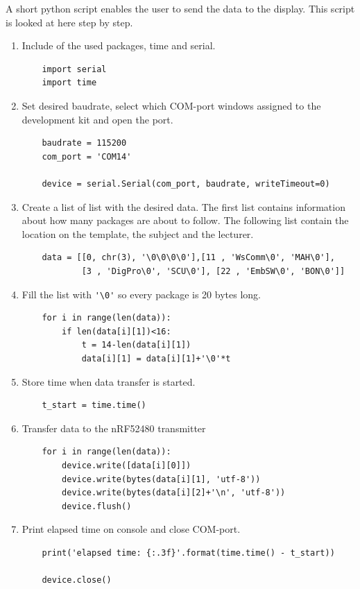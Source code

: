 A short python script enables the user to send the data to the display.
This script is looked at here step by step.

\begin{enumerate}
	\item Include of the used packages, time and serial.
	\begin{lstlisting}
	import serial
	import time
	\end{lstlisting}	
	\item Set desired baudrate, select which COM-port windows assigned to the development kit and open the port.
	\begin{lstlisting}
	baudrate = 115200
	com_port = 'COM14'
	
	device = serial.Serial(com_port, baudrate, writeTimeout=0)
	\end{lstlisting}
	\item Create a list of list with the desired data.
	The first list contains information about how many packages are about to follow.
	The following list contain the location on the template, the subject and the lecturer.
	\begin{lstlisting}
	data = [[0, chr(3), '\0\0\0\0'],[11 , 'WsComm\0', 'MAH\0'],
			[3 , 'DigPro\0', 'SCU\0'], [22 , 'EmbSW\0', 'BON\0']]
	\end{lstlisting}
	\item Fill the list with \lstinline|'\0'| so every package is 20 bytes long.
	\begin{lstlisting}
	for i in range(len(data)):
		if len(data[i][1])<16:
			t = 14-len(data[i][1])
			data[i][1] = data[i][1]+'\0'*t
	\end{lstlisting}
	\item Store time when data transfer is started.
	\begin{lstlisting}
	t_start = time.time()
	\end{lstlisting}
	\item Transfer data to the nRF52480 transmitter
	\begin{lstlisting}
	for i in range(len(data)):
		device.write([data[i][0]]) 
		device.write(bytes(data[i][1], 'utf-8'))       
		device.write(bytes(data[i][2]+'\n', 'utf-8'))
		device.flush()
	\end{lstlisting}	
	\item Print elapsed time on console and close COM-port.
	\begin{lstlisting}
	print('elapsed time: {:.3f}'.format(time.time() - t_start))
	
	device.close()
	\end{lstlisting}
	
\end{enumerate}